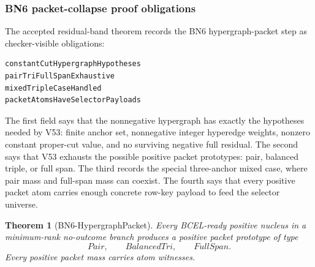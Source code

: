 \documentclass[10.5pt,a4paper]{article}
\newtheorem{theorem}{Theorem}[section]
\begin{document}
\subsubsection{BN6 packet-collapse proof obligations}
The accepted residual-band theorem records the BN6 hypergraph-packet step as checker-visible obligations:
\begin{lstlisting}
constantCutHypergraphHypotheses
pairTriFullSpanExhaustive
mixedTripleCaseHandled
packetAtomsHaveSelectorPayloads
\end{lstlisting}
The first field says that the nonnegative hypergraph has exactly the hypotheses needed by V53: finite anchor set, nonnegative integer hyperedge weights, nonzero constant proper-cut value, and no surviving negative full residual.  The second says that V53 exhausts the possible positive packet prototypes: pair, balanced triple, or full span.  The third records the special three-anchor mixed case, where pair mass and full-span mass can coexist.  The fourth says that every positive packet atom carries enough concrete row-key payload to feed the selector universe.

\begin{theorem}[BN6-HypergraphPacket]
Every BCEL-ready positive nucleus in a minimum-rank no-outcome branch produces a positive packet prototype of type
\[
Pair,
\qquad BalancedTri,
\qquad FullSpan.
\]
Every positive packet mass carries atom witnesses.
\end{theorem}
\end{document}
